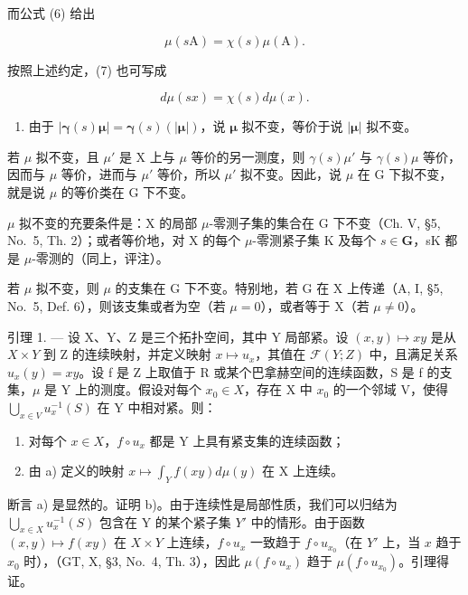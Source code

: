 而公式 (6) 给出

\[
\mu (s \mathrm{A}) = \chi (s) \mu (\mathrm{A}).\tag{9}
\]

按照上述约定，(7) 也可写成

\[
d \mu (s x) = \chi (s) d \mu (x).\tag{10}
\]

\begin{enumerate}
\def\labelenumi{\arabic{enumi})}
\setcounter{enumi}{2}
\tightlist
\item
  由于 \(|\pmb{\gamma}(s)\pmb{\mu}| = \pmb{\gamma}(s)(|\pmb{\mu}|)\)，说 \(\pmb{\mu}\) 拟不变，等价于说 \(|\pmb{\mu}|\) 拟不变。
\end{enumerate}

若 \(\mu\) 拟不变，且 \(\mu'\) 是 X 上与 \(\mu\) 等价的另一测度，则 \(\gamma(s)\mu'\) 与 \(\gamma(s)\mu\) 等价，因而与 \(\mu\) 等价，进而与 \(\mu'\) 等价，所以 \(\mu'\) 拟不变。因此，说 \(\mu\) 在 G 下拟不变，就是说 \(\mu\) 的等价类在 G 下不变。

\(\mu\) 拟不变的充要条件是：X 的局部 \(\mu\)-零测子集的集合在 G 下不变（Ch. V, §5, No.~5, Th. 2）；或者等价地，对 X 的每个 \(\mu\)-零测紧子集 K 及每个 \(s \in \mathbf{G}\)，sK 都是 \(\mu\)-零测的（同上，评注）。

若 \(\mu\) 拟不变，则 \(\mu\) 的支集在 G 下不变。特别地，若 G 在 X 上传递（A, I, §5, No.~5, Def. 6），则该支集或者为空（若 \(\mu = 0\)），或者等于 X（若 \(\mu \neq 0\)）。

引理 1. --- 设 X、Y、Z 是三个拓扑空间，其中 Y 局部紧。设 \((x,y)\mapsto xy\) 是从 \(X\times Y\) 到 Z 的连续映射，并定义映射 \(x\mapsto u_{x}\)，其值在 \(\mathcal{F}(Y;Z)\) 中，且满足关系 \(u_{x}(y)=xy\)。设 f 是 Z 上取值于 R 或某个巴拿赫空间的连续函数，S 是 f 的支集，\(\mu\) 是 Y 上的测度。假设对每个 \(x_{0}\in X\)，存在 X 中 \(x_{0}\) 的一个邻域 V，使得 \(\bigcup_{x\in V}u_{x}^{-1}(S)\) 在 Y 中相对紧。则：

\begin{enumerate}
\def\labelenumi{\alph{enumi})}
\tightlist
\item
  对每个 \(x \in X\)，\(f \circ u_{x}\) 都是 Y 上具有紧支集的连续函数；
\item
  由 a) 定义的映射 \(x \mapsto \int_{Y} f(xy) d\mu(y)\) 在 X 上连续。
\end{enumerate}

断言 a) 是显然的。证明 b)。由于连续性是局部性质，我们可以归结为 \(\bigcup_{x\in X}u_x^{-1}(S)\) 包含在 Y 的某个紧子集 \(Y'\) 中的情形。由于函数 \((x,y)\mapsto f(xy)\) 在 \(X\times Y\) 上连续，\(f\circ u_x\) 一致趋于 \(f\circ u_{x_0}\)（在 \(Y'\) 上，当 \(x\) 趋于 \(x_0\) 时），（GT, X, §3, No.~4, Th. 3），因此 \(\mu(f \circ u_x)\) 趋于 \(\mu(f \circ u_{x_0})\)。引理得证。

